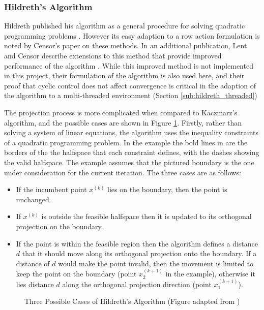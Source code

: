 \subsubsection{Hildreth's Algorithm}\label{subsub:hildreth_algo}

Hildreth published his algorithm as a general procedure for solving quadratic programming problems \cite{HildrethAPROCEDURE}. However its easy adaption to a row action formulation is noted by Censor's paper on these methods. In an additional publication, Lent and Censor describe extensions to this method that provide improved performance of the algorithm \cite{Lents1980EXTENSIONSPROGRAMMING}. While this improved method is not implemented in this project, their formulation of the algorithm is also used here, and their proof that cyclic control does not affect convergence is critical in the adaption of the algorithm to a multi-threaded environment (Section \ref{sub:hildreth_threaded})

The projection process is more complicated when compared to Kaczmarz's algorithm, and the possible cases are shown in Figure \ref{fig:hildreth_cases}. Firstly, rather than solving a system of linear equations, the algorithm uses the inequality constraints of a quadratic programming problem. In the example the bold lines in are the borders of the the halfspace that each constraint defines, with the dashes showing the valid halfspace. The example assumes that the pictured boundary is the one under consideration for the current iteration. The three cases are as follows:

\begin{itemize}
    \item If the incumbent point $x^{(k)}$ lies on the boundary, then the point is unchanged.
    \item If $x^{(k)}$ is outside the feasible halfspace then it is updated to its orthogonal projection on the boundary.
    \item If the point is within the feasible region then the algorithm defines a distance $d$ that it should move along its orthogonal projection onto the boundary. If a distance of $d$ would make the point invalid, then the movement is limited to keep the point on the boundary (point $x_2^{(k+1)}$ in the example), otherwise it lies distance $d$ along the orthogonal projection direction (point $x_1^{(k+1)}$).
\end{itemize}

\begin{figure}[thb]
    \centering
    
    \caption{Three Possible Cases of Hildreth's Algorithm (Figure adapted from \cite{Lents1980EXTENSIONSPROGRAMMING})}
    \label{fig:hildreth_cases}
\end{figure}


